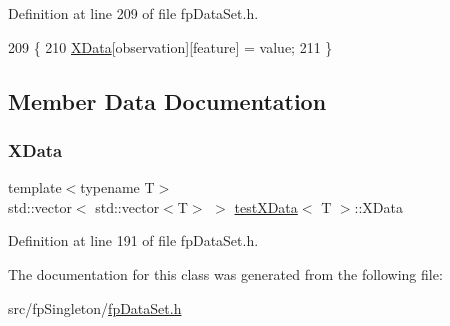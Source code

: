 Definition at line 209 of file fp\+Data\+Set.\+h.


\begin{DoxyCode}
209                                                                                             \{
210             \hyperlink{classtestXData_aabb02eb5f97c674d6a88c8194498b621}{XData}[observation][feature] = value;
211         \}
\end{DoxyCode}


\subsection{Member Data Documentation}
\mbox{\label{classtestXData_aabb02eb5f97c674d6a88c8194498b621}} 
\subsubsection{\texorpdfstring{X\+Data}{XData}}
{\footnotesize\ttfamily template$<$typename T$>$ \\
std\+::vector$<$ std\+::vector$<$T$>$ $>$ \hyperlink{classtestXData}{test\+X\+Data}$<$ T $>$\+::X\+Data\hspace{0.3cm}{\ttfamily [private]}}



Definition at line 191 of file fp\+Data\+Set.\+h.



The documentation for this class was generated from the following file\+:\begin{DoxyCompactItemize}
\item 
src/fp\+Singleton/\hyperlink{fpDataSet_8h}{fp\+Data\+Set.\+h}\end{DoxyCompactItemize}
